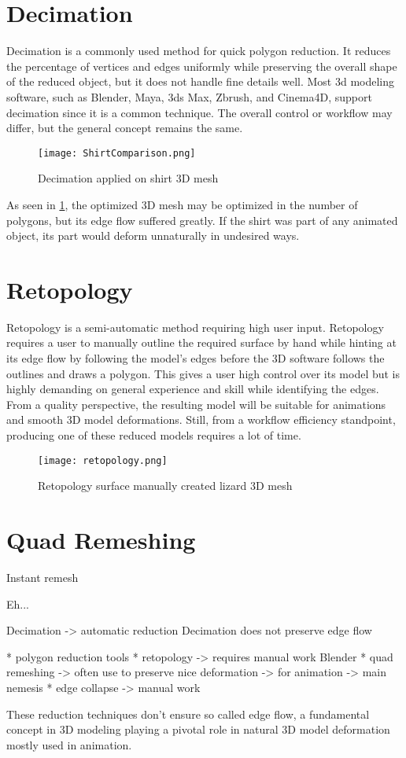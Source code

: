 \section{Decimation}

Decimation is a commonly used method for quick polygon reduction. It reduces the percentage of vertices and edges uniformly while preserving the overall shape of the reduced object, but it does not handle fine details well. Most 3d modeling software, such as Blender, Maya, 3ds Max, Zbrush, and Cinema4D, support decimation since it is a common technique. The overall control or workflow may differ, but the general concept remains the same.\cite{decimation}

\begin{figure}[h]
    \centering
    \texttt{[image: ShirtComparison.png]}
    \caption{Decimation applied on shirt 3D mesh \cite{decimation}}
    \label{fig:shirt_comp}
\end{figure}

As seen in \ref{fig:shirt_comp}, the optimized 3D mesh may be optimized in the number of polygons, but its edge flow suffered greatly. If the shirt was part of any animated object, its part would deform unnaturally in undesired ways.

\section{Retopology}

Retopology is a semi-automatic method requiring high user input. Retopology requires a user to manually outline the required surface by hand while hinting at its edge flow by following the model's edges before the 3D software follows the outlines and draws a polygon. This gives a user high control over its model but is highly demanding on general experience and skill while identifying the edges. From a quality perspective, the resulting model will be suitable for animations and smooth 3D model deformations. Still, from a workflow efficiency standpoint, producing one of these reduced models requires a lot of time.

\begin{figure}[h]
    \centering
    \texttt{[image: retopology.png]}
    \caption{Retopology surface manually created lizard 3D mesh \cite{retopology}}
    \label{fig:retopology}
\end{figure}

\section{Quad Remeshing}

Instant remesh

Eh...

Decimation -> automatic reduction
Decimation does not preserve edge flow

* polygon reduction tools
* retopology -> requires manual work Blender
* quad remeshing -> often use to preserve nice deformation -> for animation -> main nemesis
* edge collapse -> manual work

These reduction techniques don't ensure so called edge flow, a fundamental concept in 3D modeling playing a pivotal role in natural 3D model deformation mostly used in animation.